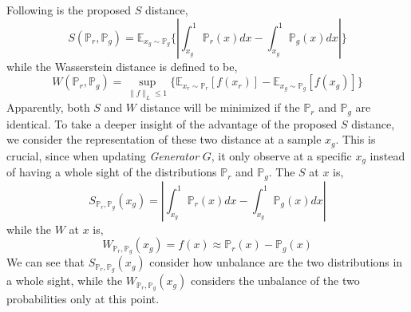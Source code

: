 \documentclass[letterpaper]{article} %
\begin{document}
Following is the proposed $S$ distance,
\begin{equation}\label{s-distance}
  S(\mathbb{P}_r,\mathbb{P}_g)=\mathbb{E}_{x_g \sim \mathbb{P}_g} \{ | \int_{x_g}^{1} \mathbb{P}_r(x) d x - \int_{x_g}^{1} \mathbb{P}_g(x) d x | \}
\end{equation}
while the Wasserstein distance is defined to be,
\begin{equation}\label{w-distance}
  W(\mathbb{P}_r,\mathbb{P}_g)=\sup_{\|f\|_L \leq 1} \{ \mathbb{E}_{x_r \sim \mathbb{P}_r} [f(x_r)] - \mathbb{E}_{x_g \sim \mathbb{P}_g} [f(x_g)] \}
\end{equation}
Apparently, both $S$ and $W$ distance will be minimized if the $\mathbb{P}_r$ and $\mathbb{P}_g$ are identical.
To take a deeper insight of the advantage of the proposed $S$ distance, we consider the representation of these two distance at a sample $x_g$.
This is crucial, since when updating \textit{Generator} $G$, it only observe at a specific $x_g$ instead of having a whole sight of the distributions $\mathbb{P}_r$ and $\mathbb{P}_g$.
The $S$ at $x$ is,
\begin{equation}\label{s-distance-at-xg}
  S_{\mathbb{P}_r,\mathbb{P}_g}(x_g)= | \int_{x_g}^{1} \mathbb{P}_r(x) d x - \int_{x_g}^{1} \mathbb{P}_g(x) d x |
\end{equation}
while the $W$ at $x$ is,
\begin{equation}\label{w-distance-xg}
  W_{\mathbb{P}_r,\mathbb{P}_g}(x_g) = f(x) \approx \mathbb{P}_r(x) - \mathbb{P}_g(x)
\end{equation}
We can see that $S_{\mathbb{P}_r,\mathbb{P}_g}(x_g)$ consider how unbalance are the two distributions in a whole sight, while the $W_{\mathbb{P}_r,\mathbb{P}_g}(x_g)$ considers the unbalance of the two probabilities only at this point.
\end{document}
